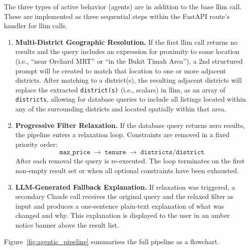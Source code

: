The three types of active behavior (agents) are in addition to the base llim call. These are implemented as three sequential steps within the FastAPI route's handler for llim calls.

\begin{enumerate}
    \item \textbf{Multi-District Geographic Resolution.}
    If the first llim call returns no results and the query includes an expression for proximity to some location (i.e., ``near Orchard MRT'' or ``in the Bukit Timah Area''), a 2nd structured prompt will be created to match that location to one or more adjacent districts. After matching to a district(s), the resulting adjacent districts will replace the extracted \texttt{district(s)} (i.e., scalars) in llim, as an array of \texttt{districts}, allowing for database queries to include all listings located within any of the surrounding districts and located spatially within that area.

    \item \textbf{Progressive Filter Relaxation.}
    If the database query returns zero results, the pipeline enters a relaxation loop.
    Constraints are removed in a fixed priority order:
    \[
        \texttt{max\_price} \;\to\; \texttt{tenure} \;\to\; \texttt{districts}/\texttt{district}
    \]
    After each removal the query is re-executed. The loop terminates on the first
    non-empty result set or when all optional constraints have been exhausted.

    \item \textbf{LLM-Generated Fallback Explanation.}
    If relaxation was triggered, a secondary Claude call receives the original query
    and the relaxed filter as input and produces a one-sentence plain-text explanation
    of what was changed and why. This explanation is displayed to the user in an amber
    notice banner above the result list.
\end{enumerate}

Figure~\ref{fig:agentic_pipeline} summarises the full pipeline as a flowchart.

